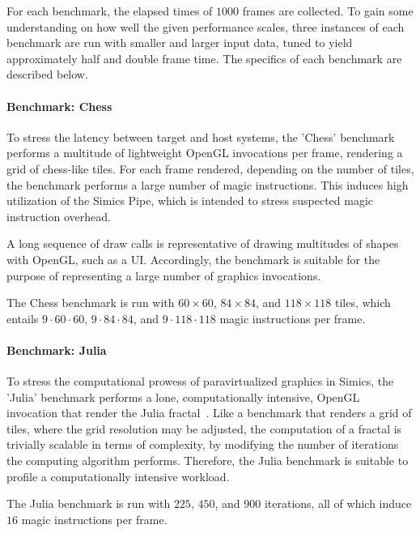 For each benchmark, the elapsed times of $1000$ frames are collected.
To gain some understanding on how well the given performance scales, three instances of each benchmark are run with smaller and larger input data, tuned to yield approximately half and double frame time.
The specifics of each benchmark are described below.



\paragraph{Benchmark: Chess}
\label{par:experimentalmethodology_benchmarking_benchmarkchess}
To stress the latency between target and host systems, the 'Chess' benchmark performs a multitude of lightweight OpenGL invocations per frame, rendering a grid of chess-like tiles.
For each frame rendered, depending on the number of tiles, the benchmark performs a large number of magic instructions.
This induces high utilization of the Simics Pipe, which is intended to stress suspected magic instruction overhead.

A long sequence of draw calls is representative of drawing multitudes of shapes with OpenGL, such as a UI.
Accordingly, the benchmark is suitable for the purpose of representing a large number of graphics invocations.

The Chess benchmark is run with $60\times60$, $84\times84$, and $118\times118$ tiles, which entails $9\cdot60\cdot60$, $9\cdot84\cdot84$, and $9\cdot118\cdot118$ magic instructions per frame.

\paragraph{Benchmark: Julia}
\label{par:experimentalmethodology_benchmarking_benchmarkjulia}
To stress the computational prowess of paravirtualized graphics in Simics, the 'Julia' benchmark performs a lone, computationally intensive, OpenGL invocation that render the Julia fractal~.
Like a benchmark that renders a grid of tiles, where the grid resolution may be adjusted, the computation of a fractal is trivially scalable in terms of complexity, by modifying the number of iterations the computing algorithm performs.
Therefore, the Julia benchmark is suitable to profile a computationally intensive workload.

The Julia benchmark is run with $225$, $450$, and $900$ iterations, all of which induce $16$ magic instructions per frame.

